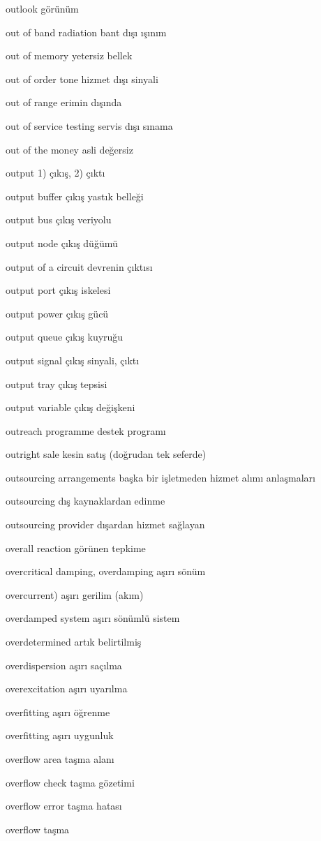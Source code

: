 \documentclass[12pt,fleqn]{article}\usepackage{../../common}
\begin{document}
outlook görünüm

out of band radiation bant dışı ışınım

out of memory yetersiz bellek

out of order tone hizmet dışı sinyali

out of range erimin dışında

out of service testing servis dışı sınama

out of the money asli değersiz

output 1) çıkış, 2) çıktı

output buffer çıkış yastık belleği

output bus çıkış veriyolu

output node çıkış düğümü

output of a circuit devrenin çıktısı

output port çıkış iskelesi

output power çıkış gücü

output queue çıkış kuyruğu

output signal çıkış sinyali, çıktı

output tray çıkış tepsisi

output variable çıkış değişkeni

outreach programme destek programı

outright sale kesin satış (doğrudan tek seferde)

outsourcing arrangements başka bir işletmeden hizmet alımı anlaşmaları

outsourcing dış kaynaklardan edinme

outsourcing provider dışardan hizmet sağlayan

overall reaction görünen tepkime

overcritical damping, overdamping aşırı sönüm

overcurrent) aşırı gerilim (akım)

overdamped system aşırı sönümlü sistem

overdetermined artık belirtilmiş

overdispersion aşırı saçılma

overexcitation aşırı uyarılma

overfitting aşırı öğrenme

overfitting aşırı uygunluk

overflow area taşma alanı

overflow check taşma gözetimi

overflow error taşma hatası

overflow taşma
\end{document}
